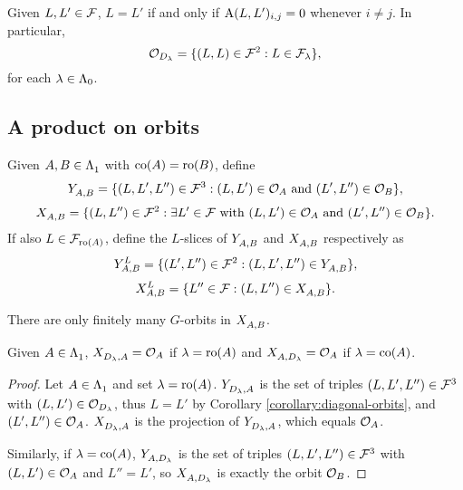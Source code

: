 \documentclass[a4paper, 11pt]{report}
\begin{document}
\begin{corollary}\label{corollary:diagonal-orbits}
Given $L,L'\in\flags$, $L=L'$ if and only if $\type{L}{L'}_{i,j}=0$ whenever $i\neq j$. In particular,
\begin{equation*}
\orbit{D_\lambda} = \{(L,L)\in\flags^2: L\in\flags_\lambda\},
\end{equation*}
for each $\lambda\in\compositions$.
\end{corollary}

\subsection{A product on orbits}\label{sec:orbit-product}

Given $A,B\in\matrices$ with $\co{A}=\ro{B}$, define
\begin{equation*}
\yprod{A,B} = \{ (L,L',L'')\in\flags^3: (L,L')\in\orbit{A} \text{ and } (L',L'')\in\orbit{B}\},
\end{equation*}
\begin{equation*}
\xprod{A,B} = \{(L,L'')\in\flags^2:\exists L'\in\flags\text{ with } (L,L')\in\orbit{A} \text{ and } (L',L'')\in\orbit{B}\}.
\end{equation*}
If also $L\in\flags_{\ro{A}}$, define the $L$-slices of $\yprod{A,B}$ and $\xprod{A,B}$ respectively as
\begin{equation*}
\yprod[L]{A,B} = \{(L',L'')\in\flags^2: (L,L',L'')\in\yprod{A,B}\},
\end{equation*}
\begin{equation*}
\xprod[L]{A,B} = \{L''\in\flags: (L,L'')\in\xprod{A,B}\}.
\end{equation*}

\begin{observation}
There are only finitely many $G$-orbits in $\xprod{A,B}$.
\end{observation}

\begin{lemma}\label{lemma:product-with-diagonal-orbits}
Given $A\in\matrices$, $\xprod{D_\lambda,A}=\orbit{A}$ if $\lambda=\ro{A}$ and $\xprod{A,D_\lambda}=\orbit{A}$ if $\lambda=\co{A}$.
\end{lemma}

\begin{proof}
Let $A\in\matrices$ and set $\lambda=\ro{A}$. $\yprod{D_\lambda,A}$ is the set of triples $(L,L',L'')\in\flags^3$ with $(L,L')\in\orbit{D_\lambda}$, thus $L=L'$ by Corollary \ref{corollary:diagonal-orbits}, and $(L',L'')\in\orbit{A}$. $\xprod{D_\lambda,A}$ is the projection of $\yprod{D_\lambda,A}$, which equals $\orbit{A}$.

Similarly, if $\lambda=\co{A}$, $\yprod{A,D_\lambda}$ is the set of triples $(L,L',L'')\in\flags^3$ with $(L,L')\in\orbit{A}$ and $L''=L'$, so $\xprod{A,D_\lambda}$ is exactly the orbit $\orbit{B}$.
\end{proof}
\end{document}
